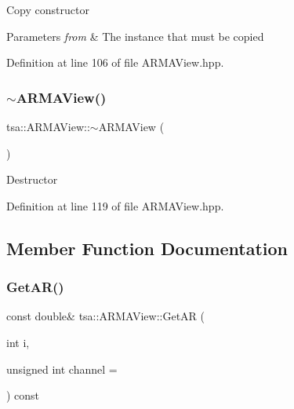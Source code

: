 Copy constructor


\begin{DoxyParams}{Parameters}
{\em from} & The instance that must be copied \\
\hline
\end{DoxyParams}


Definition at line 106 of file A\+R\+M\+A\+View.\+hpp.

\mbox{\label{classtsa_1_1_a_r_m_a_view_a44779ce53323f8e6a1457974e9242004}} 
\subsubsection{\texorpdfstring{$\sim$\+A\+R\+M\+A\+View()}{~ARMAView()}}
{\footnotesize\ttfamily tsa\+::\+A\+R\+M\+A\+View\+::$\sim$\+A\+R\+M\+A\+View (\begin{DoxyParamCaption}{ }\end{DoxyParamCaption})\hspace{0.3cm}{\ttfamily [inline]}}

Destructor 

Definition at line 119 of file A\+R\+M\+A\+View.\+hpp.



\subsection{Member Function Documentation}
\mbox{\label{classtsa_1_1_a_r_m_a_view_a1a6f6606b2c5c8d0ef7d1484538e57d3}} 
\subsubsection{\texorpdfstring{Get\+A\+R()}{GetAR()}}
{\footnotesize\ttfamily const double\& tsa\+::\+A\+R\+M\+A\+View\+::\+Get\+AR (\begin{DoxyParamCaption}\item[{int}]{i,  }\item[{unsigned int}]{channel = {} }\end{DoxyParamCaption}) const\hspace{0.3cm}{\ttfamily [inline]}}

